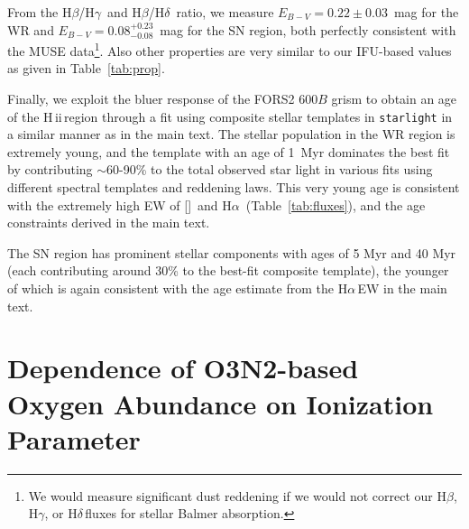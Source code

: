 \documentclass[traditabstract]{aa}
\newcommand{\hb}{H$\beta$}
\newcommand{\ha}{H$\alpha$}
\newcommand{\hg}{H$\gamma$}
\newcommand{\hd}{H$\delta$}
\newcommand{\hii}{\mbox{H\,{\sc ii}}}
\newcommand{\oiii}{[\ion{O}{iii}]}
\begin{document}
\begin{appendix}
From the \hb/\hg\, and \hb/\hd\, ratio, we measure $E_{B-V}=0.22\pm0.03$~mag for the WR and $E_{B-V}=0.08_{-0.08}^{+0.23}$~mag for the SN region, both perfectly consistent with the MUSE data\footnote{We would measure significant dust reddening if we would not correct our \hb, \hg, or \hd\,fluxes for stellar Balmer absorption.}. Also other properties are very similar to our IFU-based values as given in Table~\ref{tab:prop}.

Finally, we exploit the bluer response of the FORS2 600$B$ grism to obtain an age of the \hii\,region through a fit using composite stellar templates in \texttt{starlight} in a similar manner as in the main text. The stellar population in the WR region is extremely young, and the \citet{2003MNRAS.344.1000B} template with an age of 1~Myr dominates the best fit by contributing $\sim$60-90\% to the total observed star light in various fits using different spectral templates and reddening laws. This very young age is consistent with the extremely high EW of \oiii\, and \ha\, (Table~\ref{tab:fluxes}), and the age constraints derived in the main text.

The SN region has prominent stellar components with ages of 5 Myr and 40 Myr (each contributing around 30\% to the best-fit composite template), the younger of which is again consistent with the age estimate from the \ha\,EW in the main text.

\section{Dependence of O3N2-based Oxygen Abundance on Ionization Parameter}
\label{sec:abundancevsion}


\end{appendix}
\end{document}
